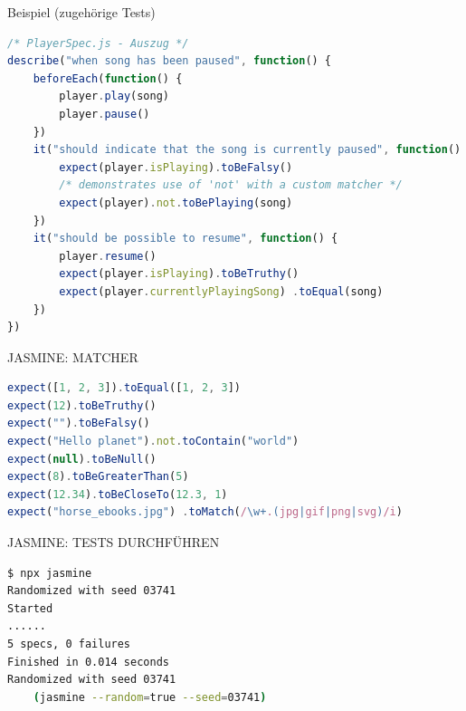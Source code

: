 \begin{examplecode}{Beispiel (zugehörige Tests)}
\begin{lstlisting}[language=JavaScript, style=basesmol]
/* PlayerSpec.js - Auszug */
describe("when song has been paused", function() {
    beforeEach(function() {
        player.play(song)
        player.pause()
    })
    it("should indicate that the song is currently paused", function() {
        expect(player.isPlaying).toBeFalsy()
        /* demonstrates use of 'not' with a custom matcher */
        expect(player).not.toBePlaying(song)
    })
    it("should be possible to resume", function() {
        player.resume()
        expect(player.isPlaying).toBeTruthy()
        expect(player.currentlyPlayingSong) .toEqual(song)
    })
})
\end{lstlisting}
\end{examplecode}

\begin{code}{JASMINE: MATCHER}
\begin{lstlisting}[language=JavaScript, style=basesmol]
expect([1, 2, 3]).toEqual([1, 2, 3])
expect(12).toBeTruthy()
expect("").toBeFalsy()
expect("Hello planet").not.toContain("world")
expect(null).toBeNull()
expect(8).toBeGreaterThan(5)
expect(12.34).toBeCloseTo(12.3, 1)
expect("horse_ebooks.jpg") .toMatch(/\w+.(jpg|gif|png|svg)/i)
\end{lstlisting}
\end{code}

\begin{KR}{JASMINE: TESTS DURCHFÜHREN}
\begin{lstlisting}[language=bash, style=basesmol]
$ npx jasmine
Randomized with seed 03741
Started
......
5 specs, 0 failures
Finished in 0.014 seconds
Randomized with seed 03741 
    (jasmine --random=true --seed=03741)
\end{lstlisting}
\end{KR}